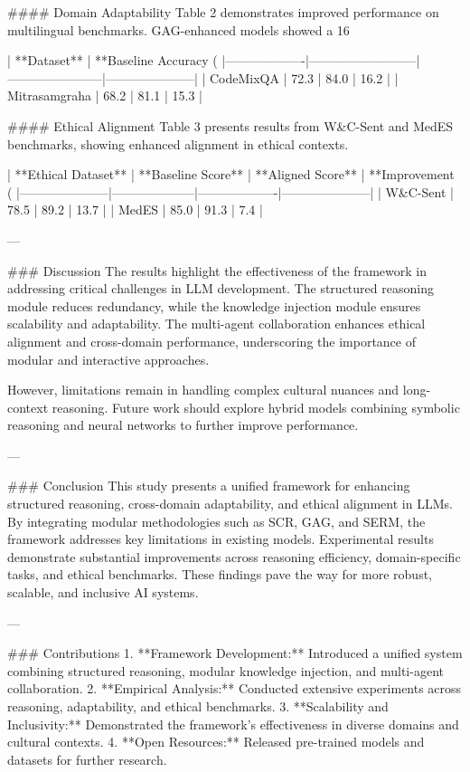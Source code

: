 #### Domain Adaptability  
Table 2 demonstrates improved performance on multilingual benchmarks. GAG-enhanced models showed a 16%

| **Dataset**       | **Baseline Accuracy (%
|-------------------|--------------------------|-----------------------|---------------------|  
| CodeMixQA         | 72.3                     | 84.0                  | 16.2                |  
| Mitrasamgraha      | 68.2                     | 81.1                  | 15.3                |  

#### Ethical Alignment  
Table 3 presents results from W&C-Sent and MedES benchmarks, showing enhanced alignment in ethical contexts.

| **Ethical Dataset** | **Baseline Score** | **Aligned Score** | **Improvement (%
|---------------------|--------------------|-------------------|---------------------|  
| W&C-Sent            | 78.5              | 89.2              | 13.7                |  
| MedES               | 85.0              | 91.3              | 7.4                 |  

---

### Discussion  
The results highlight the effectiveness of the framework in addressing critical challenges in LLM development. The structured reasoning module reduces redundancy, while the knowledge injection module ensures scalability and adaptability. The multi-agent collaboration enhances ethical alignment and cross-domain performance, underscoring the importance of modular and interactive approaches.

However, limitations remain in handling complex cultural nuances and long-context reasoning. Future work should explore hybrid models combining symbolic reasoning and neural networks to further improve performance.

---

### Conclusion  
This study presents a unified framework for enhancing structured reasoning, cross-domain adaptability, and ethical alignment in LLMs. By integrating modular methodologies such as SCR, GAG, and SERM, the framework addresses key limitations in existing models. Experimental results demonstrate substantial improvements across reasoning efficiency, domain-specific tasks, and ethical benchmarks. These findings pave the way for more robust, scalable, and inclusive AI systems.

---

### Contributions  
1. **Framework Development:** Introduced a unified system combining structured reasoning, modular knowledge injection, and multi-agent collaboration.  
2. **Empirical Analysis:** Conducted extensive experiments across reasoning, adaptability, and ethical benchmarks.  
3. **Scalability and Inclusivity:** Demonstrated the framework’s effectiveness in diverse domains and cultural contexts.  
4. **Open Resources:** Released pre-trained models and datasets for further research.

